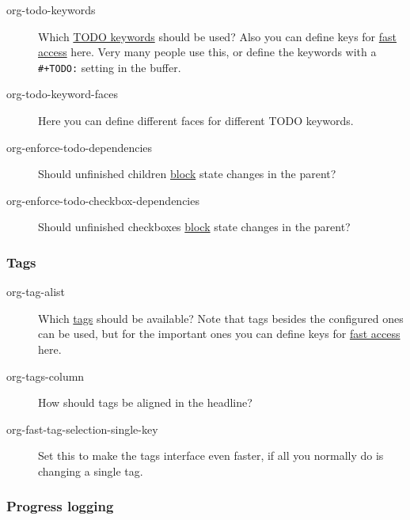 \documentclass[11pt]{article}
\begin{document}
\begin{description}
\item[{org-todo-keywords}] Which \href{http://orgmode.org/manual/TODO-extensions.html\#TODO-extensions}{TODO keywords} should be used?  Also you
can define keys for \href{http://orgmode.org/manual/Fast-access-to-TODO-states.html\#Fast-access-to-TODO-states}{fast access} here.  Very many people use this,
or define the keywords with a \texttt{\#+TODO:} setting in the buffer.

\item[{org-todo-keyword-faces}] Here you can define different faces for
different TODO keywords.

\item[{org-enforce-todo-dependencies}] Should unfinished children \href{http://orgmode.org/manual/TODO-dependencies.html\#TODO-dependencies}{block}
state changes in the parent?

\item[{org-enforce-todo-checkbox-dependencies}] Should unfinished
checkboxes \href{http://orgmode.org/manual/TODO-dependencies.html\#TODO-dependencies}{block} state changes in the parent?
\end{description}

\subsubsection*{Tags}
\label{sec:org50aa0f7}


\begin{description}
\item[{org-tag-alist}] Which \href{http://orgmode.org/manual/Tags.html\#Tags}{tags} should be available?  Note that tags
besides the configured ones can be used, but for the important
ones you can define keys for \href{http://orgmode.org/manual/Setting-tags.html\#Setting-tags}{fast access} here.

\item[{org-tags-column}] How should tags be aligned in the headline?

\item[{org-fast-tag-selection-single-key}] Set this to make the tags
interface even faster, if all you normally do is changing a single
tag.
\end{description}

\subsubsection*{Progress logging}
\label{sec:org30e1e10}
\end{document}
